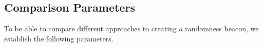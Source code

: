 \subsection{Comparison Parameters}
\label{sub:comparison_parameters}
To be able to compare different approaches to creating a randomness beacon, we establish the following parameters.



